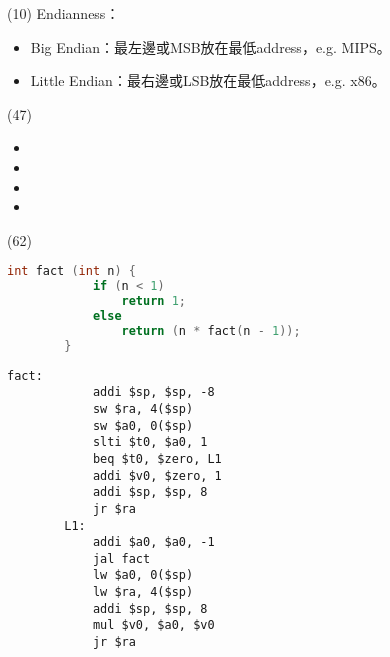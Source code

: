 \item \begin{theorem}{(10)} Endianness：\begin{itemize}
        \item Big Endian：最左邊或MSB放在最低address，e.g. MIPS。
        \item Little Endian：最右邊或LSB放在最低address，e.g. x86。
    \end{itemize}
\end{theorem}

\item \begin{theorem}{(47)} \quad\quad \begin{itemize}
        \item {}
        \item {}
        \item {}
        \item {}
    \end{itemize}
\end{theorem}

\item \begin{theorem}{(62)} \quad\quad \begin{lstlisting}[language={C}]
        int fact (int n) {
            if (n < 1)
                return 1;
            else
                return (n * fact(n - 1));            
        }
    \end{lstlisting}
    \begin{lstlisting}[language={[x86masm]Assembler}]
        fact:
            addi $sp, $sp, -8
            sw $ra, 4($sp)
            sw $a0, 0($sp)
            slti $t0, $a0, 1
            beq $t0, $zero, L1
            addi $v0, $zero, 1
            addi $sp, $sp, 8
            jr $ra
        L1:
            addi $a0, $a0, -1
            jal fact
            lw $a0, 0($sp)
            lw $ra, 4($sp)
            addi $sp, $sp, 8
            mul $v0, $a0, $v0
            jr $ra
    \end{lstlisting}
\end{theorem}
